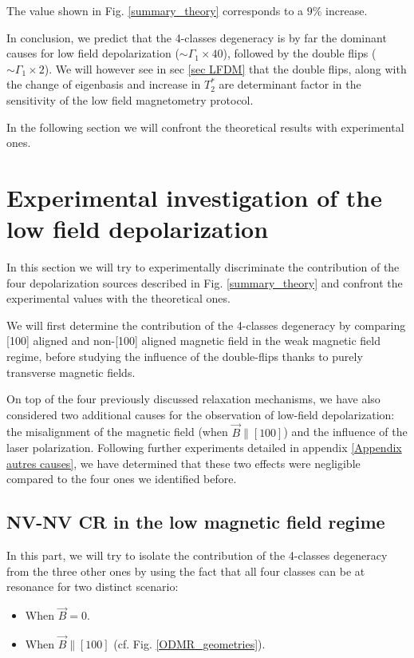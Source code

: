 \documentclass[a4paper, 11pt]{report}
\begin{document}
The value shown in Fig. \ref{summary_theory} corresponds to a $9 \%$ increase.

\bigskip

In conclusion, we predict that the 4-classes degeneracy is by far the dominant causes for low field depolarization ($\sim \Gamma_1 \times 40$), followed by the double flips ($\sim \Gamma_1 \times 2$). We will however see in sec \ref{sec LFDM} that the double flips, along with the change of eigenbasis and increase in $T_2^*$ are determinant factor in the sensitivity of the low field magnetometry protocol.

In the following section we will confront the theoretical results with experimental ones.

\section{Experimental investigation of the low field depolarization}
\label{sec 4.3}
In this section we will try to experimentally discriminate the contribution of the four depolarization sources described in Fig. \ref{summary_theory} and confront the experimental values with the theoretical ones. 

We will first determine the contribution of the 4-classes degeneracy by comparing [100] aligned and non-[100] aligned magnetic field in the weak magnetic field regime, before studying the influence of the double-flips thanks to purely transverse magnetic fields.

On top of the four previously discussed relaxation mechanisms, we have also considered two additional causes for the observation of low-field depolarization: the misalignment of the magnetic field (when $\vec{B}\parallel [100]$) and the influence of the laser polarization. Following further experiments detailed in appendix \ref{Appendix autres causes}, we have determined that these two effects were negligible compared to the four ones we identified before.

\subsection{NV-NV CR in the low magnetic field regime}


In this part, we will try to isolate the contribution of the 4-classes degeneracy from the three other ones by using the fact that all four classes can be at resonance for two distinct scenario:
\begin{itemize}
\item When $\vec{B}=0$.
\item When $\vec{B}\parallel [100]$ (cf. Fig. \ref{ODMR_geometries}).
\end{itemize}
\end{document}
